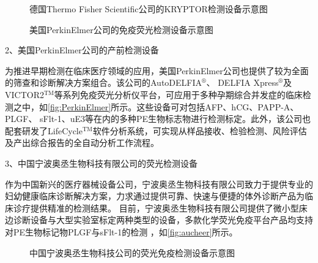 \begin{figure}[htbp]
    \centering
    \quad
    \caption{\label{fig:B·R·A·H·M·S}德国Thermo Fisher Scientific公司的KRYPTOR检测设备示意图}
\end{figure}
\vspace{1cm}
\begin{figure}[htbp]
    \centering
    \quad
    \caption{\label{fig:PerkinElmer}美国PerkinElmer公司的免疫荧光检测设备示意图}
\end{figure}
\vspace{1cm}

2、美国PerkinElmer公司的产前检测设备

为推进早期检测在临床医疗领域的应用，美国PerkinElmer公司也提供了较为全面的筛查和诊断解决方案组合\cite{perkinelmer2023}。该公司的AutoDELFIA$^\circledR$、
DELFIA Xpress$^\circledR$及VICTOR2$^\text{TM}$等系列免疫荧光分析仪平台，可应用于多种孕期综合并发症的临床检测之中，如\autoref{fig:PerkinElmer}所示。这些设备可对包括AFP、hCG、PAPP-A、PLGF、
sFlt-1、uE3等在内的多种PE生物标志物进行检测标定。此外，该公司也配套研发了LifeCycle$^\text{TM}$软件分析系统，可实现从样品接收、检验检测、风险评估及产出综合报告的全自动分析工作流程。

3、中国宁波奥丞生物科技有限公司的荧光检测设备

作为中国新兴的医疗器械设备公司，宁波奥丞生物科技有限公司致力于提供专业的妇幼健康临床诊断解决方案，力求通过提供可靠、快速与便捷的体外诊断产品为临床诊疗提供精准的检测结果。
目前，宁波奥丞生物科技有限公司提供了微小型床边诊断设备与大型实验室标定两种类型的设备，多款化学荧光免疫平台产品均支持对PE生物标记物PLGF与sFlt-1的检测
，如\autoref{fig:aucheer}所示\cite{aucheer2023}。
\begin{figure}[h]
    \centering
    \quad
    \caption{\label{fig:aucheer}中国宁波奥丞生物科技公司的荧光免疫检测设备示意图}
\end{figure}

